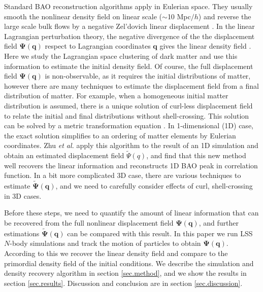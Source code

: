 \documentclass[aps,prd,twocolumn,superscriptaddress,amsfont,amssymb,amsmath,nofootinbib,showpacs,balancelastpage]{revtex4-1}
\newcommand{\bs}{\boldsymbol}
\begin{document}
Standard BAO reconstruction algorithms apply in Eulerian space.
They usually smooth the nonlinear density field on
linear scale ($\sim$10 Mpc$/h$) and reverse the large 
scale bulk flows by a negative Zel'dovich linear displacement
\citep{2007ApJ...664..675E,2009PhRvD..80l3501N,2009PhRvD..79f3523P}.
In the linear Lagrangian perturbation theory, the 
negative divergence of the the displacement field
$\bs\Psi(\bs q)$ respect to Lagrangian coordinates $\bs q$
gives the linear density field \citep{2010PhDT.........4J}.
Here we study the Lagrangian space clustering of dark matter
and use this information to estimate the initial density field.
Of course, the full displacement field $\bs\Psi(\bs q)$
is non-observable, as it requires the initial distributions of matter, however there are 
many techniques to estimate the displacement field from a final 
distribution of matter. For example, when a homogeneous initial matter distribution 
is assumed, there is a unique solution of curl-less displacement field to relate 
the initial and final distributions without shell-crossing. This solution can be 
solved by a metric transformation equation \citep{1995ApJS..100..269P,1998ApJS..115...19P}.
In 1-dimensional (1D) case, the exact solution 
simplifies to an ordering of matter elements by Eulerian coordinates.
Zhu {\it et al.} \cite{2016arXiv160907041Z} apply this algorithm to the result
of an 1D simulation \citep{2016JCAP...01..043M} and obtain an estimated
displacement field $\tilde\Psi(q)$, and find that this new method well recovers the linear
information and reconstructs 1D BAO peak in correlation function. 
In a bit more complicated 3D case, there are various
techniques to estimate $\tilde{\bs \Psi}(\bs q)$,
and we need to carefully consider effects of curl, shell-crossing in 3D cases.

Before these steps, we need to quantify the amount of linear information
that can be recovered from the full nonlinear displacement field $\bs\Psi(\bs q)$,
and further estimations $\tilde{\bs \Psi}(\bs q)$ can be compared with this result.
In this paper we run LSS $N$-body simulations and track the motion of
particles to obtain $\bs\Psi(\bs q)$. According to this we recover the linear density
field and compare to the primordial density field of the initial
conditions. We describe the simulation and density recovery algorithm in section
\ref{sec.method}, and we show the results in section \ref{sec.results}.
Discussion and conclusion are in section \ref{sec.discussion}.
\end{document}
